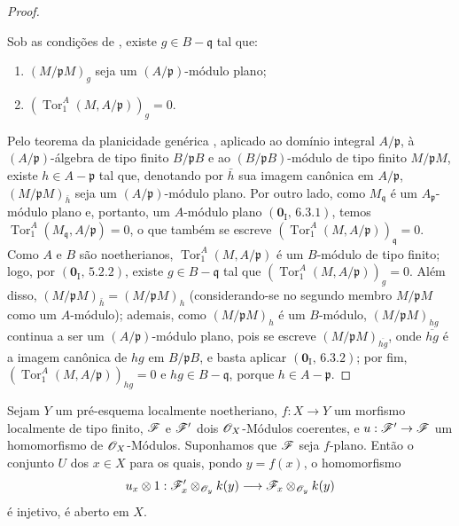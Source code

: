 \begin{proof}
\begin{lemma}[11.1.1.2]
\label{IV.11.1.1.2}
Sob as condições de , existe $g\in B-\mathfrak q$ tal que:
\begin{enumerate}[label=(\roman*)]
  \item $(M/\mathfrak pM)_g$ seja um $(A/\mathfrak p)$-módulo plano;
  \item $(\operatorname{Tor}_1^A(M,A/\mathfrak p))_g=0$.
\end{enumerate}
\end{lemma}


Pelo teorema da planicidade genérica , aplicado ao domínio integral $A/\mathfrak p$, à $(A/\mathfrak p)$-álgebra de tipo finito $B/\mathfrak pB$ e ao $(B/\mathfrak pB)$-módulo de tipo finito $M/\mathfrak pM$, existe $h\in A-\mathfrak p$ tal que, denotando por $\bar h$ sua imagem canônica em $A/\mathfrak p$, $(M/\mathfrak pM)_{\bar h}$ seja um $(A/\mathfrak p)$-módulo plano.
Por outro lado, como $M_{\mathfrak q}$ é um $A_{\mathfrak p}$-módulo plano e, portanto, um $A$-módulo plano $(\mathbf 0_{\mathrm I},\,6.3.1)$, temos $\operatorname{Tor}_1^A(M_{\mathfrak q},A/\mathfrak p)=0$, o que também se escreve $(\operatorname{Tor}_1^A(M,A/\mathfrak p))_{\mathfrak q}=0$.
Como $A$ e $B$ são noetherianos, $\operatorname{Tor}_1^A(M,A/\mathfrak p)$ é um $B$-módulo de tipo finito; logo, por $(\mathbf 0_{\mathrm I},\,5.2.2)$, existe $g\in B-\mathfrak q$ tal que $(\operatorname{Tor}_1^A(M,A/\mathfrak p))_g=0$.
Além disso, $(M/\mathfrak pM)_{\bar h}=(M/\mathfrak pM)_h$ (considerando-se no segundo membro $M/\mathfrak pM$ como um $A$-módulo); ademais, como $(M/\mathfrak pM)_h$ é um $B$-módulo, $(M/\mathfrak pM)_{hg}$ continua a ser um $(A/\mathfrak p)$-módulo plano, pois se escreve $(M/\mathfrak pM)_{\overline{hg}}$, onde $\overline{hg}$ é a imagem canônica de $hg$ em $B/\mathfrak pB$, e basta aplicar $(\mathbf 0_{\mathrm I},\,6.3.2)$; por fim, $(\operatorname{Tor}_1^A(M,A/\mathfrak p))_{hg}=0$ e $hg\in B-\mathfrak q$, porque $h\in A-\mathfrak p$.
\end{proof}

\begin{corollary}[11.1.2]
\label{IV.11.1.2}
Sejam $Y$ um pré-esquema localmente noetheriano, $f:X\to Y$ um morfismo localmente de tipo finito, $\mathscr{F}$ e $\mathscr{F}'$ dois $\mathscr{O}_X$-Módulos coerentes, e $u:\sh{F}'\to\sh{F}$ um homomorfismo de $\mathscr{O}_X$-Módulos. Suponhamos que $\mathscr{F}$ seja $f$-plano. Então o conjunto $U$ dos $x\in X$ para os quais, pondo $y=f(x)$, o homomorfismo
\[
  u_x\otimes1:\mathscr{F}'_x\otimes_{\mathscr{O}_y}k(y)\longrightarrow
  \mathscr{F}_x\otimes_{\mathscr{O}_y}k(y)
\]
é injetivo, é aberto em $X$.
\end{corollary}


